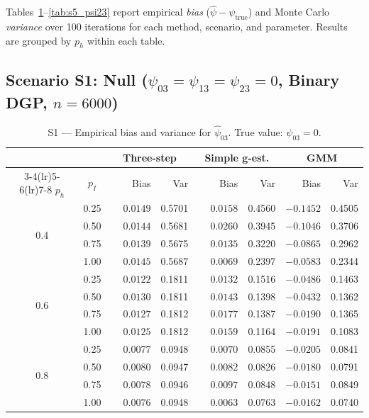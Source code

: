 \documentclass[12pt]{article}
\begin{document}
Tables~\ref{tab:s1_psi03}--\ref{tab:s5_psi23} report empirical
\emph{bias} ($\hat\psi - \psi_{\mathrm{true}}$) and Monte Carlo
\emph{variance} over 100 iterations for each method, scenario, and
parameter.  Results are grouped by $p_h$ within each table.

\subsection{Scenario S1: Null ($\psi_{03}=\psi_{13}=\psi_{23}=0$, Binary DGP, $n=6000$)}

\begin{table}[htbp]
\centering
\caption{S1 --- Empirical bias and variance for $\hat\psi_{03}$.
         True value: $\psi_{03}=0$.}
\label{tab:s1_psi03}
\small
\begin{tabular}{cc rr rr rr}
\toprule
& & \multicolumn{2}{c}{Three-step} & \multicolumn{2}{c}{Simple g-est.} & \multicolumn{2}{c}{GMM} \\
\cmidrule(lr){3-4}\cmidrule(lr){5-6}\cmidrule(lr){7-8}
$p_h$ & $p_I$ & Bias & Var & Bias & Var & Bias & Var \\
\midrule
\multirow{4}{*}{0.4}
 & 0.25 & $\phantom{-}0.0149$ & 0.5701 & $\phantom{-}0.0158$ & 0.4560 & $-0.1452$ & 0.4505 \\
 & 0.50 & $\phantom{-}0.0144$ & 0.5681 & $\phantom{-}0.0260$ & 0.3945 & $-0.1046$ & 0.3706 \\
 & 0.75 & $\phantom{-}0.0139$ & 0.5675 & $\phantom{-}0.0135$ & 0.3220 & $-0.0865$ & 0.2962 \\
 & 1.00 & $\phantom{-}0.0145$ & 0.5687 & $\phantom{-}0.0069$ & 0.2397 & $-0.0583$ & 0.2344 \\
\midrule
\multirow{4}{*}{0.6}
 & 0.25 & $\phantom{-}0.0122$ & 0.1811 & $\phantom{-}0.0132$ & 0.1516 & $-0.0486$ & 0.1463 \\
 & 0.50 & $\phantom{-}0.0130$ & 0.1811 & $\phantom{-}0.0143$ & 0.1398 & $-0.0432$ & 0.1362 \\
 & 0.75 & $\phantom{-}0.0127$ & 0.1812 & $\phantom{-}0.0177$ & 0.1387 & $-0.0190$ & 0.1365 \\
 & 1.00 & $\phantom{-}0.0125$ & 0.1812 & $\phantom{-}0.0159$ & 0.1164 & $-0.0191$ & 0.1083 \\
\midrule
\multirow{4}{*}{0.8}
 & 0.25 & $\phantom{-}0.0077$ & 0.0948 & $\phantom{-}0.0070$ & 0.0855 & $-0.0205$ & 0.0841 \\
 & 0.50 & $\phantom{-}0.0080$ & 0.0947 & $\phantom{-}0.0082$ & 0.0826 & $-0.0180$ & 0.0791 \\
 & 0.75 & $\phantom{-}0.0078$ & 0.0946 & $\phantom{-}0.0097$ & 0.0848 & $-0.0151$ & 0.0849 \\
 & 1.00 & $\phantom{-}0.0076$ & 0.0948 & $\phantom{-}0.0063$ & 0.0763 & $-0.0162$ & 0.0740 \\
\bottomrule
\end{tabular}
\end{table}
\end{document}
